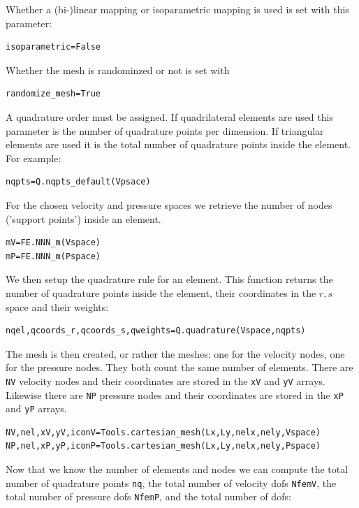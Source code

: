 Whether a (bi-)linear mapping or isoparametric mapping is used is set with 
this parameter:
\begin{lstlisting}
isoparametric=False
\end{lstlisting}

Whether the mesh is randominzed or not is set with 
\begin{lstlisting}
randomize_mesh=True
\end{lstlisting}


A quadrature order must be assigned. If quadrilateral elements are used
this parameter is the number of quadrature points per dimension. 
If triangular elements are used it is the total number of quadrature points 
inside the element. For example: 
\begin{lstlisting}
nqpts=Q.nqpts_default(Vpsace)
\end{lstlisting}

For the chosen velocity and pressure spaces we retrieve the number of nodes 
('support points') inside an element.
\begin{lstlisting}
mV=FE.NNN_m(Vspace)
mP=FE.NNN_m(Pspace)
\end{lstlisting}

We then setup the quadrature rule for an element. This function 
returns the number of quadrature points inside the element, 
their coordinates in the $r,s$ space and their weights: 
\begin{lstlisting}
nqel,qcoords_r,qcoords_s,qweights=Q.quadrature(Vspace,nqpts)
\end{lstlisting}

The mesh is then created, or rather the meshes: one for the 
velocity nodes, one for the pressure nodes. They both count the 
same number of elements. There are \lstinline{NV} velocity nodes and their
coordinates are stored in the \lstinline{xV} and \lstinline{yV} arrays.
Likewise there are \lstinline{NP} pressure nodes and their
coordinates are stored in the \lstinline{xP} and \lstinline{yP} arrays. 

\begin{lstlisting}
NV,nel,xV,yV,iconV=Tools.cartesian_mesh(Lx,Ly,nelx,nely,Vspace)
NP,nel,xP,yP,iconP=Tools.cartesian_mesh(Lx,Ly,nelx,nely,Pspace)
\end{lstlisting}

Now that we know the number of elements and nodes we can compute the 
total number of quadrature points \lstinline{nq}, 
the total number of velocity dofs \lstinline{NfemV}, 
the total number of pressure dofs \lstinline{NfemP}, 
and the total number of dofs:

